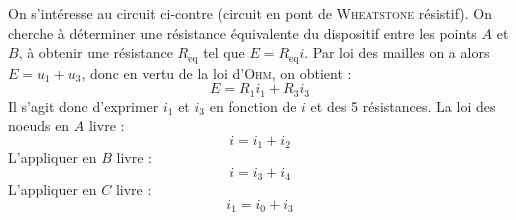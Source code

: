 \documentclass[a4paper,french,bookmarks]{article}
\begin{document}
    \begin{minipage}{0.5\linewidth}
        On s'intéresse au circuit ci-contre (circuit en pont de \textsc{Wheatstone} résistif). On cherche à déterminer une résistance équivalente du dispositif entre les points $A$ et $B$, \ie à obtenir une résistance $R_\text{eq}$ tel que $E = R_\text{eq}i$. Par loi des mailles on a alors $E = u_1 + u_3$, donc en vertu de la loi d'\textsc{Ohm}, on obtient :
        \begin{equation}
            E = R_1i_1 + R_3i_3
        \end{equation}
        Il s'agit donc d'exprimer $i_1$ et $i_3$ en fonction de $i$ et des 5 résistances. La loi des noeuds en $A$ livre :
        \begin{equation}
            i = i_1 + i_2
        \end{equation}
        L'appliquer en $B$ livre :
        \begin{equation}
            i = i_3 + i_4
        \end{equation}
        L'appliquer en $C$ livre :
        \begin{equation}
            i_1 = i_0 + i_3
        \end{equation}
    \end{minipage}
    \hfill
    \begin{minipage}{0.45\linewidth}
        \begin{center}
        \end{center}
    \end{minipage}
    \text{}\bigskip
    
\end{document}
